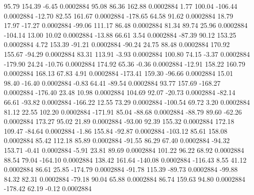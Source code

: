        95.79      154.39       -6.45     0.0002884
       95.08       86.36      162.88     0.0002884
        1.77      100.04     -106.44     0.0002884
      -12.70       82.55      161.67     0.0002884
     -178.65       64.58       91.62     0.0002884
       18.79       17.97      -17.27     0.0002884
      -99.06      111.17       86.48     0.0002884
       81.34       89.74       25.96     0.0002884
     -104.14       13.00       10.02     0.0002884
      -13.88       66.61        3.54     0.0002884
      -87.39       90.12      153.25     0.0002884
        4.72      153.39      -91.21     0.0002884
      -90.24       24.75       88.48     0.0002884
      170.92      155.67      -94.29     0.0002884
       83.31      113.91       -3.93     0.0002884
      100.80       74.15       -3.37     0.0002884
     -179.90       24.24      -10.76     0.0002884
      174.92       65.36       -0.36     0.0002884
      -12.91      158.22      160.79     0.0002884
      168.13       67.83        4.91     0.0002884
     -173.41      159.30      -96.66     0.0002884
       15.01       98.40      -16.40     0.0002884
       -0.83       64.41      -89.54     0.0002884
       93.77      157.69     -168.27     0.0002884
     -176.40       23.48       10.98     0.0002884
      104.69       92.07      -20.73     0.0002884
      -82.14       66.61      -93.82     0.0002884
     -166.22       12.55       73.29     0.0002884
     -100.54       69.72        3.20     0.0002884
       81.12       22.55      102.20     0.0002884
     -171.91       85.04      -88.68     0.0002884
      -88.79       89.60      -62.26     0.0002884
      173.27       95.02       21.89     0.0002884
      -93.00       92.39      155.32     0.0002884
      172.18      109.47      -84.64     0.0002884
       -1.86      155.84      -92.87     0.0002884
     -103.12       85.61      158.08     0.0002884
       85.42      112.18       85.89     0.0002884
      -91.55       86.29       67.40     0.0002884
      -94.32      153.71       -0.41     0.0002884
       -5.91       23.81       89.69     0.0002884
      101.22       96.22       68.92     0.0002884
       88.54       79.04     -164.10     0.0002884
      138.42      161.64     -140.08     0.0002884
     -116.43        8.55       41.12     0.0002884
       86.61       25.85     -174.79     0.0002884
      -91.78      115.39      -89.73     0.0002884
      -99.88       84.32       82.31     0.0002884
      -79.18       90.04       65.88     0.0002884
       86.74      159.63       94.80     0.0002884
     -178.42       62.19       -0.12     0.0002884
